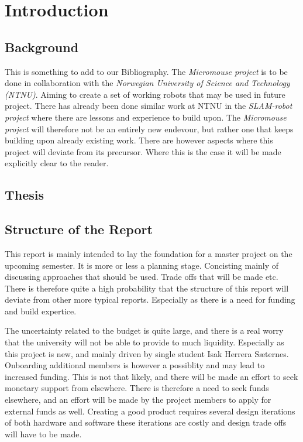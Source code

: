 \section{Introduction}

\subsection{Background}
This is something to add to our Bibliography. \cite{Swarm_M138_manual}
The \emph{Micromouse project} is to be done in collaboration with the \emph{Norwegian University of Science and Technology (NTNU)}. Aiming to create a set of working robots that 
may be used in future project. There has already been done similar work at NTNU in the \emph{SLAM-robot project} where there are lessons and experience to build upon. The \emph{Micromouse project}
will therefore not be an entirely new endevour, but rather one that keeps building upon already existing work. There are however aspects where this project will deviate from its precursor. Where this is the case
it will be made explicitly clear to the reader.

\subsection{Thesis}

\subsection{Structure of the Report}
This report is mainly intended to lay the foundation for a master project on the upcoming semester. It is more or less a planning stage. Concisting mainly of discussing approaches that should be used. Trade offs
that will be made etc. There is therefore quite a high probability that the structure of this report will deviate from other more typical reports. Especially as there is a need for funding and build expertice.

The uncertainty related to the budget is quite large, and there is a real worry that the university will not be able to provide to much liquidity. Especially as this project is new, and mainly driven by single student
Isak Herrera Sæternes. Onboarding additional members is however a possiblity and may lead to increased funding. This is not that likely, and there will be made an effort to seek monetary support from elsewhere. There
is therefore a need to seek funds elsewhere, and an effort will be made by the project members to apply for external funds as well. Creating a good product requires several design iterations of both hardware and software
these iterations are costly and design trade offs will have to be made.

